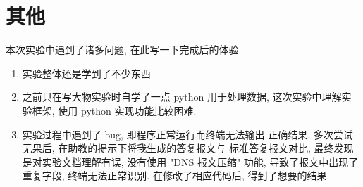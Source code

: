 \documentclass[UTF8]{ctexart}
\begin{document}
\begin{sloppypar}
\vspace*{7em}


\section{其他}
    本次实验中遇到了诸多问题, 在此写一下完成后的体验.
    \begin{enumerate}
        \item 实验整体还是学到了不少东西
        \item 之前只在写大物实验时自学了一点 python 用于处理数据,
         这次实验中理解实验框架, 使用 python 实现功能比较困难.
        \item 实验过程中遇到了 bug, 即程序正常运行而终端无法输出
        正确结果. 多次尝试无果后, 在助教的提示下将我生成的答复报文与
        标准答复报文对比, 最终发现是对实验文档理解有误, 没有使用 "DNS
         报文压缩" 功能, 导致了报文中出现了重复字段, 终端无法正常识别.
         在修改了相应代码后, 得到了想要的结果.
    \end{enumerate}
\end{sloppypar}
\end{document}
